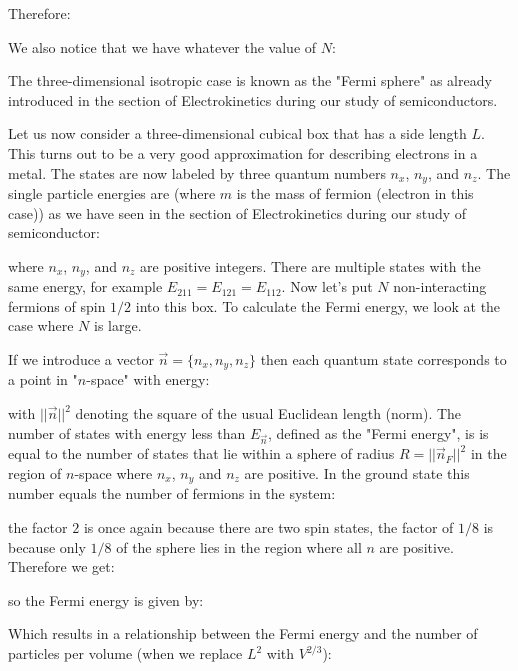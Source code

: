 	Therefore:
	
	We also notice that we have whatever the value of $N$:
	
	The three-dimensional isotropic case is known as the "Fermi sphere" as already introduced in the section of Electrokinetics during our study of semiconductors.
	
	Let us now consider a three-dimensional cubical box that has a side length $L$. This turns out to be a very good approximation for describing electrons in a metal. The states are now labeled by three quantum numbers $n_x$, $n_y$, and $n_z$. The single particle energies are (where $m$ is the mass of fermion (electron in this case)) as we have seen in the section of Electrokinetics during our study of semiconductor:
	
	where $n_x$, $n_y$, and $n_z$ are positive integers. There are multiple states with the same energy, for example $E_{211}=E_{121}=E_{112}$. Now let's put $N$ non-interacting fermions of spin $1/2$ into this box. To calculate the Fermi energy, we look at the case where $N$ is large.

	If we introduce a vector $\vec{n}=\{n_{x},n_{y},n_{z}\}$ then each quantum state corresponds to a point in "$n$-space" with energy:
	
	with $||\vec{n}||^2$  denoting the square of the usual Euclidean length (norm). The number of states with energy less than  $E_{\vec{n}}$, defined as the "Fermi energy", is  is equal to the number of states that lie within a sphere of radius $R=||\vec{n}_F||^2$ in the region of $n$-space where $n_x$, $n_y$ and $n_z$ are positive. In the ground state this number equals the number of fermions in the system:
	
	the factor $2$ is once again because there are two spin states, the factor of $1/8$ is because only $1/8$ of the sphere lies in the region where all $n$ are positive. Therefore we get:
	
	so the Fermi energy is given by:
	
	Which results in a relationship between the Fermi energy and the number of particles per volume (when we replace $L^2$ with $V^{2/3}$):
	
